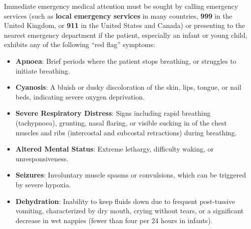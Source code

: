 Immediate emergency medical attention must be sought by calling emergency services (such as \textbf{local emergency services} in many countries, \textbf{999} in the United Kingdom, or \textbf{911} in the United States and Canada) or presenting to the nearest emergency department if the patient, especially an infant or young child, exhibits any of the following ``red flag'' symptoms:
\begin{itemize}
    \item \textbf{Apnoea}: Brief periods where the patient stops breathing, or struggles to initiate breathing.
    \item \textbf{Cyanosis}: A bluish or dusky discoloration of the skin, lips, tongue, or nail beds, indicating severe oxygen deprivation.
    \item \textbf{Severe Respiratory Distress}: Signs including rapid breathing (tachypnoea), grunting, nasal flaring, or visible sucking in of the chest muscles and ribs (intercostal and subcostal retractions) during breathing.
    \item \textbf{Altered Mental Status}: Extreme lethargy, difficulty waking, or unresponsiveness.
    \item \textbf{Seizures}: Involuntary muscle spasms or convulsions, which can be triggered by severe hypoxia.
    \item \textbf{Dehydration}: Inability to keep fluids down due to frequent post-tussive vomiting, characterized by dry mouth, crying without tears, or a significant decrease in wet nappies (fewer than four per 24 hours in infants).
\end{itemize}


